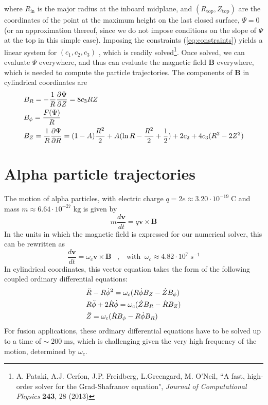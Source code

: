 \documentclass[a4]{article}
\begin{document}
where $R_{\mathrm{in}}$ is the major radius at the inboard midplane, and $(R_{\mathrm{top}} , Z_{\mathrm{top}})$ are the coordinates of the point at
the maximum height on the last closed surface, $\Psi = 0$ (or an approximation thereof, since we do not impose conditions on the slope of $\Psi$ at the top in this simple case). Imposing the constraints (\ref{eq:constraints}) yields a linear
system for $(c_{1}, c_{2}, c_{3})$ , which is readily solved\footnote{A. Pataki, A.J. Cerfon, J.P. Freidberg, L.Greengard, M. O'Neil, ``A fast, high-order solver for the Grad-Shafranov equation", \textit{Journal of Computational Physics} \textbf{243}, 28 (2013)}.
Once solved, we can evaluate $\Psi$ everywhere, and thus can evaluate the magnetic field $\mathbf{B}$ everywhere, which is needed to compute the particle trajectories. The components of $\mathbf{B}$ in cylindrical coordinates are
\begin{align}
&B_{R}=-\frac{1}{R}\frac{\partial\Psi}{\partial Z}=8c_{3}RZ\notag\\
&B_{\phi}=\frac{F(\Psi)}{R}\\
&B_{Z}=\frac{1}{R}\frac{\partial\Psi}{\partial R}=(1-A)\frac{R^2}{2}+A(\ln R-\frac{R^2}{2}+\frac{1}{2})+2c_{2}+4c_{3}(R^2-2Z^2)\notag
\end{align}

\section{Alpha particle trajectories}
The motion of alpha particles, with electric charge $q=2e\approx 3.20\cdot 10^{-19}\;\mbox{C}$ and mass $m\approx 6.64\cdot 10^{-27}\;\mbox{kg}$ is given by
\begin{equation}
m\frac{d\mathbf{v}}{dt}=q\mathbf{v}\times\mathbf{B}
\end{equation}
In the units in which the magnetic field is expressed for our numerical solver, this can be rewritten as
\begin{equation}
\frac{d\mathbf{v}}{dt}=\omega_{c}\mathbf{v}\times\mathbf{B}\;\;\;,\;\;\;\mbox{with}\;\;\omega_{c}\approx 4.82\cdot 10^7\;\mbox{s}^{-1}
\end{equation}
In cylindrical coordinates, this vector equation takes the form of the following coupled ordinary differential equations:
\begin{align}
&\ddot{R}-R\dot{\phi}^2=\omega_{c}(R\dot{\phi}B_{Z}-\dot{Z}B_{\phi})\notag\\
&R\ddot{\phi}+2\dot{R}\dot{\phi}=\omega_{c}(\dot{Z}B_{R}-\dot{R}B_{Z})\label{eq:trajectories}\\
&\ddot{Z}=\omega_{c}(\dot{R}B_{\phi}-R\dot{\phi}B_{R})\notag
\end{align}
For fusion applications, these ordinary differential equations have to be solved up to a time of $\sim\; 200\;\mbox{ms}$, which is challenging given the very high frequency of the motion, determined by $\omega_{c}$.
\end{document}
